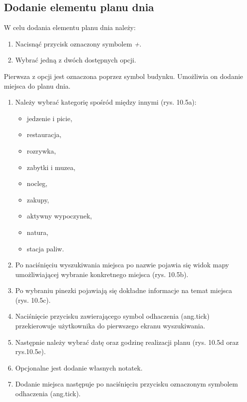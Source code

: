 \subsection{Dodanie elementu planu dnia}
W celu dodania elementu planu dnia należy:
\begin{enumerate}
\item Nacisnąć przycisk oznaczony symbolem \textit{+}.
\item Wybrać jedną z dwóch dostępnych opcji.
\end{enumerate}

\par Pierwsza z opcji jest oznaczona poprzez symbol budynku.
Umożliwia on dodanie miejsca do planu dnia.

\begin{enumerate}
\item Należy wybrać kategorię spośród między innymi (rys. 10.5a):
\begin{itemize}
\item jedzenie i picie,
\item restauracja,
\item rozrywka,
\item zabytki i muzea,
\item nocleg,
\item zakupy,
\item aktywny wypoczynek,
\item natura,
\item stacja paliw.
\end{itemize}
\item Po naciśnięciu wyszukiwania miejsca po nazwie pojawia się widok mapy umożliwiającej wybranie konkretnego miejsca (rys. 10.5b).
\item Po wybraniu pinezki pojawiają się dokładne informacje na temat miejsca (rys. 10.5c).
\item Naciśnięcie przycisku zawierającego symbol odhaczenia (ang.tick) przekierowuje użytkownika do pierwszego ekranu wyszukiwania.
\item Następnie należy wybrać datę oraz godzinę realizacji planu (rys. 10.5d oraz rys.10.5e).
\item Opcjonalne jest dodanie własnych notatek.
\item Dodanie miejsca następuje po naciśnięciu przycisku oznaczonym symbolem odhaczenia (ang.tick).
\end{enumerate}

